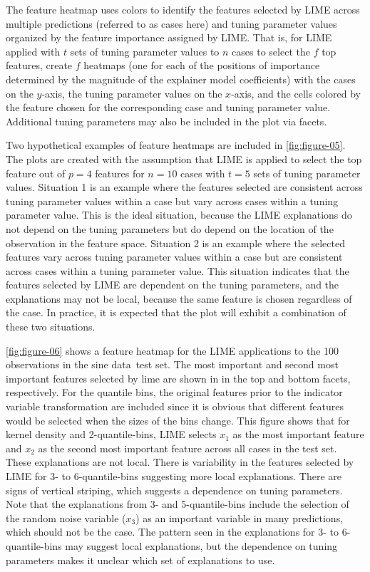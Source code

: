 \documentclass[AMS,STIX2COL]{WileyNJD-v2}\usepackage[]{graphicx}\usepackage[]{color}
\newcommand{\data}{sine data}
\begin{document}
The feature heatmap uses colors to identify the features selected by LIME across multiple predictions (referred to as cases here) and tuning parameter values organized by the  feature importance assigned by LIME. That is, for LIME applied with $t$ sets of tuning parameter values to $n$ cases to select the $f$ top features, create $f$ heatmaps (one for each of the positions of importance determined by the magnitude of the explainer model coefficients) with the cases on the $y$-axis, the tuning parameter values on the $x$-axis, and the cells colored by the feature chosen for the corresponding case and tuning parameter value. Additional tuning parameters may also be included in the plot via facets.

Two hypothetical examples of feature heatmaps are included in \autoref{fig:figure-05}. The plots are created with the assumption that LIME is applied to select the top feature out of $p=4$  features for $n=10$ cases with $t=5$ sets of tuning parameter values. Situation 1 is  an example where the features selected are consistent across tuning parameter values within a case but vary across cases within a tuning parameter value. This is the ideal situation, because the LIME explanations do not depend on the tuning parameters but do depend on the location of the observation in the feature space. Situation 2 is an example where the selected features vary across tuning parameter values within a case but are consistent across cases within a tuning parameter value. This situation indicates that the features selected by LIME are dependent on the tuning parameters, and the explanations may not be  local, because the same feature is chosen regardless of the case. In practice, it is expected that the plot will exhibit a combination of these two situations.

\autoref{fig:figure-06} shows a feature heatmap for the LIME applications to the 100 observations in the \data \ test set. The most important and second most important features selected by lime are shown in in the top and bottom facets, respectively. For the quantile bins, the original features prior to the indicator variable transformation are included since it is obvious that different features would be selected when the sizes of the bins change. This figure shows that for kernel density and 2-quantile-bins, LIME selects $x_1$ as the most important feature and $x_2$ as the second most important feature across all cases in the test set. These explanations are not local. There is variability in the features selected by LIME for 3- to 6-quantile-bins suggesting more local explanations. There are signs of vertical striping, which suggests a dependence on tuning parameters. Note that the explanations from 3- and 5-quantile-bins include the selection of the random noise variable ($x_3$) as an important variable in many predictions, which should not be the case. The pattern seen in the explanations for 3- to 6-quantile-bins may suggest local explanations, but the dependence on tuning parameters makes it unclear which set of explanations to use.
\end{document}
